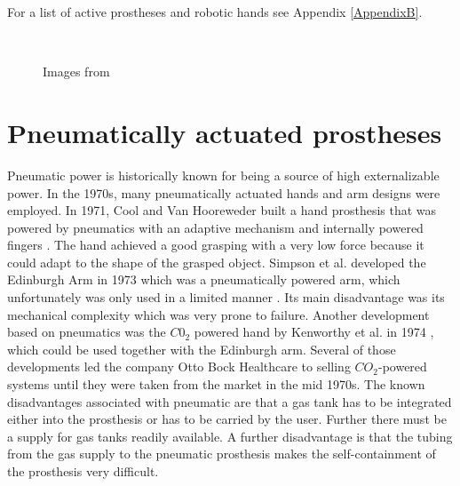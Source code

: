 \documentclass[main]{subfiles}
\begin{document}
For a list of active prostheses and robotic hands see Appendix \ref{AppendixB}.

\begin{figure}[H]
\hspace{0.15\textwidth}
\\
\caption[Electrically powered prosthesis]{Images from \cite{Billock1986}}
\label{electrically-powered-systems}
\end{figure}

\section{Pneumatically actuated prostheses}

Pneumatic power is historically known for being a source of high externalizable power. In the 1970s, many pneumatically actuated hands and arm designs were employed. In 1971, Cool and Van Hooreweder built a hand prosthesis that was powered by pneumatics with an adaptive mechanism and internally powered fingers \cite{Cool1971}. The hand achieved a good grasping with a very low force because it could adapt to the shape of the grasped object. Simpson et al. developed the Edinburgh Arm in 1973 which was a pneumatically powered arm, which unfortunately was only used in a limited manner \cite{Simpson1973}. Its main disadvantage was its mechanical complexity which was very prone to failure. Another development based on pneumatics was the $C0_2$ powered hand by Kenworthy et al. in 1974 \cite{Kenworthy1974}, which could be used together with the Edinburgh arm. Several of those developments led the company Otto Bock Healthcare to selling $CO_2$-powered systems until they were taken from the market in the mid 1970s. The known disadvantages associated with pneumatic are that a gas tank has to be integrated either into the prosthesis or has to be carried by the user. Further there must be a supply for gas tanks readily available. A further disadvantage is that the tubing from the gas supply to the pneumatic prosthesis makes the self-containment of the prosthesis very difficult.
\end{document}
